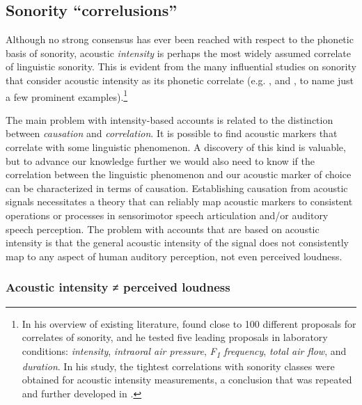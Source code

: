 \subsection{\texorpdfstring{Sonority \enquote{correlusions}}{Sonority ``correlusions''}}\label{sec:correlusions}

Although no strong consensus has ever been reached with respect to the phonetic basis of sonority, acoustic \emph{intensity} is perhaps the most widely assumed correlate of linguistic sonority. This is evident from the many influential studies on sonority that consider acoustic intensity as its phonetic correlate (e.g. \citealt{sievers1893grundzugesk, blevins1995syllable, clements1990role, heffner1969generalsk, ladefoged1975acourse, parker2008sound}, and \citealt{gordon2012sonority}, to name just a few prominent examples).\footnote{In his overview of existing literature, \citet{parker2002quantifying} found close to 100 different proposals for correlates of sonority, and he tested five leading proposals in laboratory conditions: \emph{intensity}, \emph{intraoral air pressure}, \emph{F\textsubscript{1} frequency}, \emph{total air flow}, and \emph{duration}. In his study, the tightest correlations with sonority classes were obtained for acoustic intensity measurements, a conclusion that was repeated and %
further developed 
in \citet{parker2008sound}.}

The main problem with intensity-based accounts is related to the distinction between \emph{causation} and \emph{correlation}. It is possible to find acoustic markers that correlate with some linguistic phenomenon. A discovery of this kind is valuable, but to advance our knowledge further we would also need to know if the correlation between the linguistic phenomenon and our acoustic marker of choice can be characterized in terms of causation. Establishing causation from acoustic signals necessitates a theory that can reliably map acoustic markers to consistent operations or processes in sensorimotor speech articulation and/or auditory speech perception. The problem with accounts that are based on acoustic intensity is that the general acoustic intensity of the signal does not consistently map to any aspect of human auditory perception, not even perceived loudness.

\subsubsection{Acoustic intensity ≠ perceived loudness}\label{sec:intensity}

